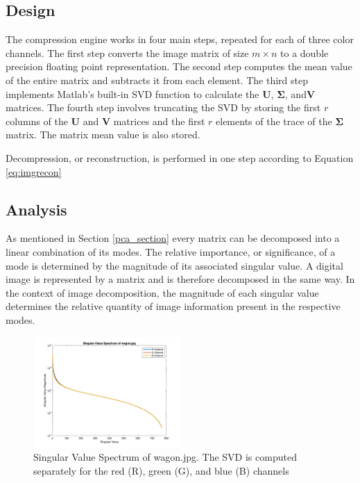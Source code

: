 \documentclass[conference]{IEEEtran}
\begin{document}
    \subsection{Design}
    The compression engine works in four main steps, repeated for each of three color channels. The first step converts the image matrix of size $m \times n$ to a double precision floating point representation. The second step computes the mean value of the entire matrix and subtracts it from each element. The third step implements Matlab's built-in SVD function to calculate the $\mathbf{U}$, $\mathbf{\Sigma}$, and$\mathbf{V}$ matrices. The fourth step involves truncating the SVD by storing the first $r$ columns of the $\mathbf{U}$ and $\mathbf{V}$ matrices and the first $r$ elements of the trace of the $\mathbf{\Sigma}$ matrix. The matrix mean value is also stored.

    Decompression, or reconstruction, is performed in one step according to Equation \ref{eq:imgrecon}
    
    \subsection{Analysis}
    As mentioned in Section \ref{pca_section} every matrix can be decomposed into a linear combination of its modes. The relative importance, or significance, of a mode is determined by the magnitude of its associated singular value. A digital image is represented by a matrix and is therefore decomposed in the same way. In the context of image decomposition, the magnitude of each singular value determines the relative quantity of image information present in the respective modes.

	 \begin{figure}[t]
        \includegraphics[width=0.5\textwidth]{svals_wagon_rgb}
        \caption{Singular Value Spectrum of wagon.jpg. The SVD is computed separately for the red (R), green (G), and blue (B) channels}
        \label{fig:svalplot}
    \end{figure}
    
\end{document}
